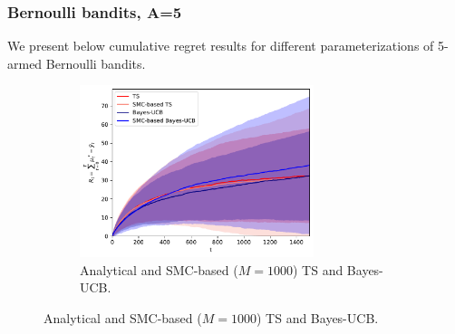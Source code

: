 \clearpage
\subsubsection{Bernoulli bandits, A=5}
\label{asssec:static_bandits_bernoulli_5}

We present below cumulative regret results for different parameterizations of 5-armed Bernoulli bandits.

\begin{figure}[!h]
	\centering
	\begin{subfigure}[b]{\textwidth}
		\centering
		\includegraphics[width=0.75\textwidth]{./fods_figs/static/bernoulli/A5/theta0.1_0.2_0.3_0.4_0.5_M1000_cumulative_regret}
		\caption{Analytical and SMC-based ($M=1000$) TS and Bayes-UCB.}
	\end{subfigure}
	

\end{figure}
